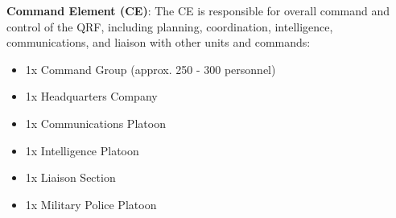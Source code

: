 \documentclass[a4paper,12pt]{article}
\begin{document}
{\begin{itemize}
	\end{itemize}
	\textbf{Command Element (CE)}: The CE is responsible for overall command and control of the QRF, including planning, coordination, intelligence, communications, and liaison with other units and commands:
	\begin{itemize}
		\item 1x Command Group (approx. 250 - 300 personnel)
		\item 1x Headquarters Company
		\item 1x Communications Platoon
		\item 1x Intelligence Platoon
		\item 1x Liaison Section
		\item 1x Military Police Platoon
	\end{itemize}
}

\clearpage

\printbibliography
\end{document}
